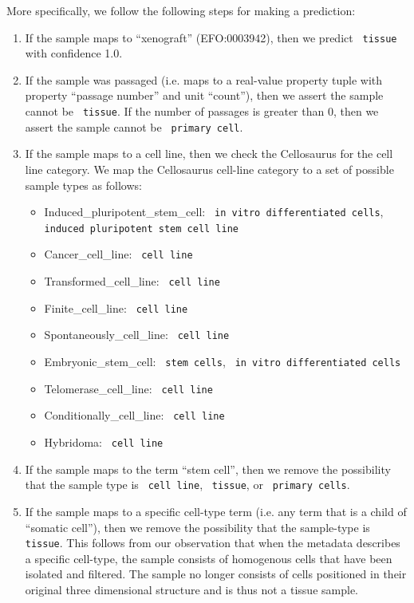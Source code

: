 More specifically, we follow the following steps for making a prediction:
\begin{enumerate}
\item If the sample maps to ``xenograft'' (EFO:0003942), then we predict \texttt{ tissue} with confidence 1.0.
\item If the sample was passaged (i.e. maps to a real-value property tuple with property ``passage number'' and unit ``count''), then we assert the sample cannot be \texttt{ tissue}. If the number of passages is greater than 0, then we assert the sample cannot be \texttt{ primary cell}.
\item If the sample maps to a cell line, then we check the Cellosaurus for the cell line category.  We map the Cellosaurus cell-line category to a set of possible sample types as follows:
\begin{itemize}
    \item Induced\_pluripotent\_stem\_cell: \texttt{ in vitro differentiated cells}, \texttt{ induced pluripotent stem cell line}
    \item Cancer\_cell\_line: \texttt{ cell line}
    \item Transformed\_cell\_line: \texttt{ cell line}
    \item Finite\_cell\_line: \texttt{ cell line}
    \item Spontaneously\_cell\_line: \texttt{ cell line}
    \item Embryonic\_stem\_cell: \texttt{ stem cells}, \texttt{ in vitro differentiated cells}
    \item Telomerase\_cell\_line: \texttt{ cell line}
    \item Conditionally\_cell\_line: \texttt{ cell line}
    \item Hybridoma: \texttt{ cell line}
\end{itemize}
\item If the sample maps to the term ``stem cell'', then we remove the possibility that the sample type is \texttt{ cell line}, \texttt{ tissue}, or \texttt{ primary cells}.  
\item If the sample maps to a specific cell-type term (i.e. any term that is a child of ``somatic cell''), then we remove the possibility that the sample-type is \texttt{ tissue}. This follows from our observation that when the metadata describes a specific cell-type, the sample consists of homogenous cells that have been isolated and filtered.  The sample no longer consists of cells positioned in their original three dimensional structure and is thus not a tissue sample.
\end{enumerate}






